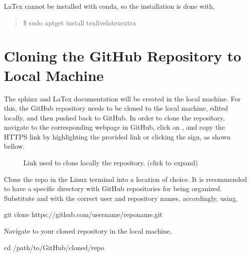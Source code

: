\documentclass[letterpaper,10pt,english]{sphinxhowto}
\let\sphinxpxdimen\pdfpxdimen\else\newdimen\sphinxpxdimen
\begin{document}
LaTex cannot be installed with conda, so the installation is done with,
\begin{quote}

\$ sudo apt\sphinxhyphen{}get install texlive\sphinxhyphen{}latex\sphinxhyphen{}extra
\end{quote}


\section{Cloning the GitHub Repository to Local Machine}
\label{\detokenize{index:cloning-the-github-repository-to-local-machine}}
The sphinx and LaTex documentation will be created in the local machine. For this, the GitHub repository needs to be cloned to the local machine, edited locally, and then pushed back to GitHub. In order to clone the repository, navigate to the corresponding webpage in GitHub, click on , and copy the HTTPS link by highlighting the provided link or clicking the  sign, as shown bellow.

\begin{figure}[htbp]
\centering
\capstart

\noindent\sphinxincludegraphics[width=600\sphinxpxdimen]{{github_repo_clone}.png}
\caption{Link used to clone locally the repository. (click to expand)}\label{\detokenize{index:id1}}\end{figure}

Clone the repo in the Linux terminal into a location of choice. It is recommended to have a specific directory with GitHub repositories for being organized. Substitute  and  with the correct user and repository names, accordingly, using,

\begin{sphinxVerbatim}[commandchars=\\\{\}]
\PYGZdl{} git clone https://github.com/\PYGZlt{}user\PYGZhy{}name\PYGZgt{}/\PYGZlt{}repo\PYGZhy{}name\PYGZgt{}.git
\end{sphinxVerbatim}

Navigate to your cloned repository in the local machine,

\begin{sphinxVerbatim}[commandchars=\\\{\}]
\PYGZdl{} cd /path/to/GitHub/cloned/repo
\end{sphinxVerbatim}
\end{document}
